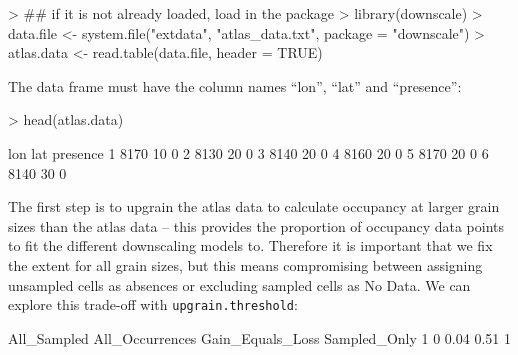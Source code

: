 \documentclass{article}[12pt, a4paper]
\begin{document}
\begin{Schunk}
\begin{Sinput}
> ## if it is not already loaded, load in the package
> library(downscale)
> data.file <- system.file("extdata", "atlas_data.txt", package = "downscale")
> atlas.data <- read.table(data.file, header = TRUE)
\end{Sinput}
\end{Schunk}

The data frame must have the column names “lon”, “lat” and “presence”:

\begin{Schunk}
\begin{Sinput}
> head(atlas.data)
\end{Sinput}
\begin{Soutput}
   lon lat presence
1 8170  10        0
2 8130  20        0
3 8140  20        0
4 8160  20        0
5 8170  20        0
6 8140  30        0

\end{Soutput}
\end{Schunk}

The first step is to upgrain the atlas data to calculate occupancy at larger grain sizes than the atlas data – this provides the proportion of occupancy data points to fit the different downscaling models to. Therefore it is important that we fix the extent for all grain sizes, but this means compromising between assigning unsampled cells as absences or excluding sampled cells as No Data. We can explore this trade-off with \texttt{upgrain.threshold}:

\begin{Schunk}
\begin{Soutput}
  All_Sampled All_Occurrences Gain_Equals_Loss Sampled_Only
1           0            0.04             0.51            1

\end{Soutput}
\end{Schunk}
\end{document}
